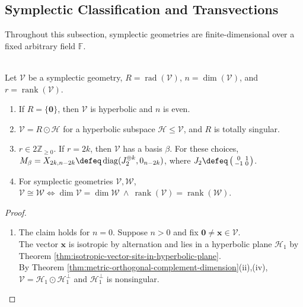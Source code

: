 \subsection{Symplectic Classification and Transvections}

Throughout this subsection, symplectic geometries are finite-dimensional over a fixed arbitrary field $\mathbb{F}$.

\begin{theorem} \label{thm:symplectic-geometries-hyperbolic-classification} \\
Let $\mathcal{V}$ be a symplectic geometry, $R=\operatorname{rad}(\mathcal{V})$, $n=\dim(\mathcal{V})$, and $r=\operatorname{rank}(\mathcal{V})$.
\begin{enumerate}[label=(\roman*)]
\setlength{\itemsep}{0pt}
\item If $R=\{\mathbf{0}\}$, then $\mathcal{V}$ is hyperbolic and $n$ is even.
\item $\mathcal{V}=R\odot\mathcal{H}$ for a hyperbolic subspace $\mathcal{H}\leq\mathcal{V}$, and $R$ is totally singular.
\item $r\in2\mathbb{Z}_{\geq0}$. If $r=2k$, then $\mathcal{V}$ has a basis $\beta$. For these choices, $M_{\beta}=X_{2k,n-2k}\defeq\operatorname{diag}(J_2^{\oplus k},0_{n-2k})$, where $J_2\defeq\left(\begin{smallmatrix}0&1\\-1&0\end{smallmatrix}\right)$.
\item For symplectic geometries $\mathcal{V},\mathcal{W}$, $\mathcal{V}\cong\mathcal{W}\Longleftrightarrow\dim\mathcal{V}=\dim\mathcal{W}\ \wedge\ \operatorname{rank}(\mathcal{V})=\operatorname{rank}(\mathcal{W})$.
\end{enumerate}
\begin{proof}
\begin{enumerate}[label=(\roman*)]
\setlength{\itemsep}{0pt}
\item[$(i)$] The claim holds for $n=0$. Suppose $n>0$ and fix $\mathbf{0}\neq\mathbf{x}\in\mathcal{V}$.\\
The vector $\mathbf{x}$ is isotropic by alternation and lies in a hyperbolic plane $\mathcal{H}_1$ by Theorem \ref{thm:isotropic-vector-sits-in-hyperbolic-plane}.\\
By Theorem \ref{thm:metric-orthogonal-complement-dimension}(ii),(iv), $\mathcal{V}=\mathcal{H}_1\odot\mathcal{H}_1^{\perp}$ and $\mathcal{H}_1^{\perp}$ is nonsingular.\\

\end{enumerate}
\end{proof}
\end{theorem}
